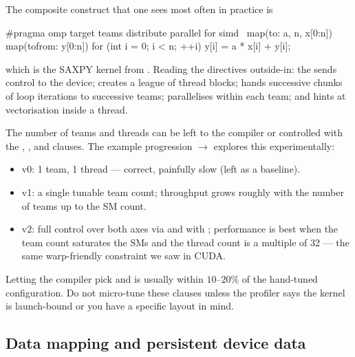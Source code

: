 The composite construct that one sees most often in practice is

\begin{codeblock}[language=C]
#pragma omp target teams distribute parallel for simd \
        map(to: a, n, x[0:n]) map(tofrom: y[0:n])
for (int i = 0; i < n; ++i)
    y[i] = a * x[i] + y[i];
\end{codeblock}

which is the SAXPY kernel from . Reading the directives outside-in: the  sends control to the device;  creates a league of thread blocks;  hands successive chunks of loop iterations to successive teams;  parallelises within each team; and  hints at vectorisation inside a thread.

The number of teams and threads can be left to the compiler or controlled with the , ,  and  clauses. The example progression  $\to$  explores this experimentally:

\begin{itemize}
    \item v0: 1 team, 1 thread --- correct, painfully slow (left as a baseline).
    \item v1: a single tunable team count; throughput grows roughly with the number of teams up to the SM count.
    \item v2: full control over both axes via \plaintt{num\_teams(ial)} and \plaintt{num\_threads(itr)} with ; performance is best when the team count saturates the SMs and the thread count is a multiple of 32 --- the same warp-friendly constraint we saw in CUDA.
\end{itemize}

\begin{tipsblock}
Letting the compiler pick  and  is usually within $10$--$20\%$ of the hand-tuned configuration. Do not micro-tune these clauses unless the profiler says the kernel is launch-bound or you have a specific layout in mind.
\end{tipsblock}

\subsection{Data mapping and persistent device data}

